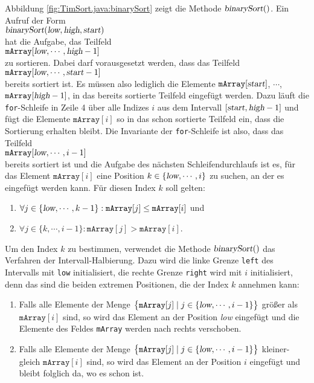 Abbildung \ref{fig:TimSort.java:binarySort} zeigt die Methode $\textsl{binarySort}()$. Ein
Aufruf der Form
\\[0.2cm]
\hspace*{1.3cm}
$\textsl{binarySort}(\textsl{low}, \textsl{high}, \textsl{start})$
\\[0.2cm]
hat die Aufgabe, das Teilfeld
\\[0.2cm]
\hspace*{1.3cm}
$\mathtt{mArray}[\textsl{low}, \cdots, \textsl{high} - 1]$
\\[0.2cm]
zu sortieren.  Dabei darf vorausgesetzt werden, dass das Teilfeld
\\[0.2cm]
\hspace*{1.3cm}
$\mathtt{mArray}[\textsl{low}, \cdots, \textsl{start} - 1]$
\\[0.2cm]
bereits sortiert ist.  Es m\"ussen also lediglich die Elemente
$\mathtt{mArray}[\textsl{start}]$, $\cdots$, $\mathtt{mArray}[\textsl{high}-1]$, in das
bereits sortierte Teilfeld eingef\"ugt werden.  Dazu l\"auft die \texttt{for}-Schleife in Zeile 4 \"uber alle
Indizes $i$ aus dem Intervall $[\textsl{start}, \textsl{high}-1]$ und f\"ugt die Elemente
$\mathtt{mArray}[i]$ so in das schon sortierte Teilfeld ein, dass die Sortierung erhalten bleibt.
Die Invariante der \texttt{for}-Schleife ist also, dass das Teilfeld
\\[0.2cm]
\hspace*{1.3cm}
$\mathtt{mArray}[\textsl{low}, \cdots, i - 1]$
\\[0.2cm]
bereits sortiert ist und die Aufgabe des n\"achsten Schleifendurchlaufs ist es, f\"ur das Element
$\texttt{mArray}[i]$ eine Position $k \in \{\textsl{low}, \cdots, i \}$ zu suchen, an der es eingef\"ugt werden kann. 
F\"ur diesen Index $k$ soll gelten:
\begin{enumerate}
\item $\forall j \in \{\textsl{low}, \cdots, k-1\}: \mathtt{mArray}[j] \leq \mathtt{mArray}[i]$
      \quad und 
\item $\forall j \in \{k, \cdots, i-1\}: \mathtt{mArray}[j] > \mathtt{mArray}[i]$.
\end{enumerate}
Um den Index $k$ zu bestimmen, verwendet die Methode $\textsl{binarySort}()$ 
das Verfahren der Intervall-Halbierung.  Dazu wird die linke
Grenze \texttt{left} des Intervalls mit \texttt{low} initialisiert, die rechte Grenze
\texttt{right} wird mit $i$ initialisiert, denn das sind die beiden extremen Positionen,
die der Index $k$ annehmen kann:
\begin{enumerate}
\item Falls alle Elemente der Menge 
      $\bigl\{ \mathtt{mArray}[j] \mid j \in \{ \textsl{low}, \cdots, i-1 \}\bigr\}$
      gr\"o{\ss}er als $\mathtt{mArray}[i]$ sind, so wird das Element an der Position \textsl{low}
      eingef\"ugt und die Elemente des Feldes \texttt{mArray} werden nach rechts verschoben.
\item Falls alle Elemente der Menge 
      $\bigl\{ \mathtt{mArray}[j] \mid j \in \{ \textsl{low}, \cdots, i-1 \}\bigr\}$
      kleiner-gleich $\mathtt{mArray}[i]$ sind, so wird das Element an der Position $i$
      eingef\"ugt und bleibt folglich da, wo es schon ist.
\end{enumerate}
